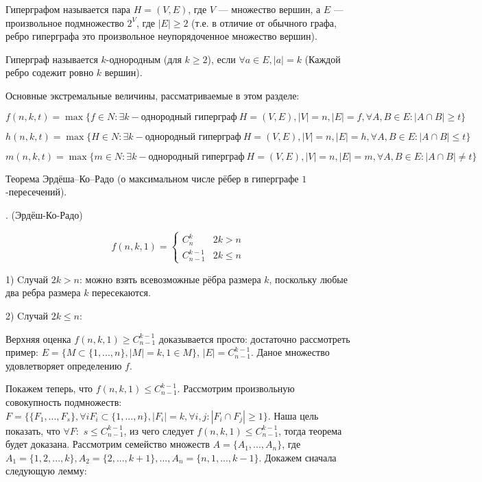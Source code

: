 \Def Гиперграфом называется пара $H = (V, E)$, где $V$ — множество вершин, а $E$ — произвольное подмножество $2^V$, где $|E| \geqslant 2$ (т.е. в отличие от обычного графа, ребро гиперграфа это произвольное неупорядоченное множество вершин).

\Def Гиперграф называется $k$-однородным (для $k \geqslant 2$), если $\forall a \in E, |a| = k$ (Каждой ребро содежит ровно $k$ вершин).

\Def Основные экстремальные величины, рассматриваемые в этом разделе:

$f(n, k, t) = \max\{f \in N : \exists k-\text{однородный гиперграф}\ H = (V, E), |V| = n, |E| = f, \forall A, B \in E : |A \cap B| \geqslant t\}$

$h(n, k, t) = \max\{H \in N : \exists k-\text{однородный гиперграф}\ H = (V, E), |V| = n, |E| = h, \forall A, B \in E : |A \cap B| \leqslant t\}$

$m(n, k, t) = \max\{m \in N : \exists k-\text{однородный гиперграф}\ H = (V, E), |V| = n, |E| = m, \forall A, B \in E : |A \cap B| \neq t\}$

Теорема Эрдёша–Ко–Радо (о максимальном числе рёбер в гиперграфе $1$-пересечений).

\Th. (Эрдёш-Ко-Радо)

\begin{equation*}
f(n, k, 1) = 
\begin{cases}
C_n^k & 2k > n \\
C_{n-1}^{k-1} & 2k \leqslant n
\end{cases}
\end{equation*}


\Proof 

1) Cлучай $2k > n$: можно взять всевозможные рёбра размера $k$, поскольку любые два ребра размера $k$ пересекаются. 

2) Cлучай $2k \leq n$: 

Верхняя оценка $f(n, k, 1) \geq C_{n-1}^{k-1}$ доказывается просто: достаточно рассмотреть пример: $E = \{M \subset \{1, ..., n\}, |M| = k, 1 \in M\}$, $|E| = C_{n-1}^{k-1}$. Даное множество удовлетворяет определению $f$. 

Покажем теперь, что $f(n, k, 1) \leq C_{n-1}^{k-1}$. Рассмотрим произвольную совокупность подмножеств: $F =\{\{F_1, ..., F_s\}, \forall i F_i \subset \{1, ..., n\}, |F_i| = k, \forall i, j: |F_i \cap F_j| \geq 1\}$. Наша цель показать, что $\forall F:$ $s \leq C_{n-1}^{k-1}$, из чего следует $f(n, k, 1) \leq C_{n-1}^{k-1}$, тогда теорема будет доказана. Рассмотрим семейство множеств $A = \{A_1, ..., A_n\}$, где $A_1 = \{1, 2, ..., k\}, A_2 = \{2, ..., k + 1\}, ..., A_n = \{n, 1, ..., k - 1\}$. Докажем сначала следующую лемму:

